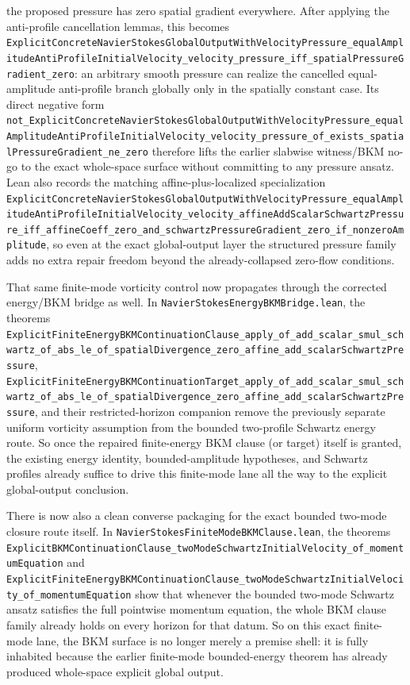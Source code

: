 \documentclass[11pt]{article}
\theoremstyle{remark}
\begin{document}
the proposed pressure has zero spatial gradient everywhere.  After applying
the anti-profile cancellation lemmas, this becomes
\texttt{ExplicitConcreteNavierStokesGlobalOutputWithVelocityPressure\_equalAmplitudeAntiProfileInitialVelocity\_velocity\_pressure\_iff\_spatialPressureGradient\_zero}:
an arbitrary smooth pressure can realize the cancelled equal-amplitude
anti-profile branch globally only in the spatially constant case.  Its direct
negative form
\texttt{not\_ExplicitConcreteNavierStokesGlobalOutputWithVelocityPressure\_equalAmplitudeAntiProfileInitialVelocity\_velocity\_pressure\_of\_exists\_spatialPressureGradient\_ne\_zero}
therefore lifts the earlier slabwise witness/BKM no-go to the exact whole-space
surface without committing to any pressure ansatz.  Lean also records the
matching affine-plus-localized specialization
\texttt{ExplicitConcreteNavierStokesGlobalOutputWithVelocityPressure\_equalAmplitudeAntiProfileInitialVelocity\_velocity\_affineAddScalarSchwartzPressure\_iff\_affineCoeff\_zero\_and\_schwartzPressureGradient\_zero\_if\_nonzeroAmplitude},
so even at the exact global-output layer the structured pressure family adds no
extra repair freedom beyond the already-collapsed zero-flow conditions.

That same finite-mode vorticity control now propagates through the corrected
energy/BKM bridge as well.  In
\texttt{NavierStokesEnergyBKMBridge.lean}, the theorems
\texttt{ExplicitFiniteEnergyBKMContinuationClause\_apply\_of\_add\_scalar\_smul\_schwartz\_of\_abs\_le\_of\_spatialDivergence\_zero\_affine\_add\_scalarSchwartzPressure},
\texttt{ExplicitFiniteEnergyBKMContinuationTarget\_apply\_of\_add\_scalar\_smul\_schwartz\_of\_abs\_le\_of\_spatialDivergence\_zero\_affine\_add\_scalarSchwartzPressure},
and their restricted-horizon companion remove the previously separate uniform
vorticity assumption from the bounded two-profile Schwartz energy route.  So
once the repaired finite-energy BKM clause (or target) itself is granted, the
existing energy identity, bounded-amplitude hypotheses, and Schwartz profiles
already suffice to drive this finite-mode lane all the way to the explicit
global-output conclusion.

There is now also a clean converse packaging for the exact bounded two-mode
closure route itself.  In \texttt{NavierStokesFiniteModeBKMClause.lean}, the
theorems
\texttt{ExplicitBKMContinuationClause\_twoModeSchwartzInitialVelocity\_of\_momentumEquation}
and
\texttt{ExplicitFiniteEnergyBKMContinuationClause\_twoModeSchwartzInitialVelocity\_of\_momentumEquation}
show that whenever the bounded two-mode Schwartz ansatz satisfies the full
pointwise momentum equation, the whole BKM clause family already holds on every
horizon for that datum.  So on this exact finite-mode lane, the BKM surface is
no longer merely a premise shell: it is fully inhabited because the earlier
finite-mode bounded-energy theorem has already produced whole-space explicit
global output.
\end{document}
